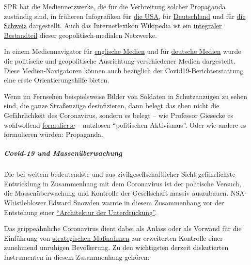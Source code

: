 SPR hat die Mediennetzwerke, die für die Verbreitung solcher Propaganda
zuständig sind, in früheren Infografiken für
\href{https://swprs.org/das-american-empire-und-seine-medien/}{die USA},
für \href{https://swprs.org/netzwerk-medien-deutschland/}{Deutschland}
und für \href{https://swprs.org/netzwerk-medien-schweiz/}{die Schweiz}
dargestellt. Auch das Internetlexikon Wikipedia ist ein
\href{https://swprs.org/wikipedia-disinformation-operation/}{integraler
Bestandteil} dieser geopolitisch-medialen Netzwerke.

In einem Mediennavigator für
\href{https://swprs.org/media-navigator/}{englische Medien} und für
\href{https://swprs.org/medien-navigator/}{deutsche Medien} wurde die
politische und geopolitische Ausrichtung verschiedener Medien
dargestellt. Diese Medien-Navigatoren können auch bezüglich der
Covid19-Bericht­erstattung eine erste Orientierungshilfe bieten.

Wenn im Fernsehen beispielsweise Bilder von Soldaten in Schutzanzügen zu
sehen sind, die ganze Straßenzüge desinfizieren, dann belegt das eben
nicht die Gefährlichkeit des Coronavirus, sondern es belegt -- wie
Professor Giesecke es wohlwollend
\href{https://www.addendum.org/coronavirus/interview-johan-giesecke/}{formulierte}
-- nutzlosen ``politischen Aktivismus''. Oder wie andere es formulieren
würden: Propaganda.

\hypertarget{covid-19-und-massenuxfcberwachung}{%
\subparagraph{\texorpdfstring{\textbf{Covid-19 und
Massenüberwachung}}{Covid-19 und Massenüberwachung}}\label{covid-19-und-massenuxfcberwachung}}

Die bei weitem bedeutendste und aus zivilgesellschaftlicher Sicht
gefährlichste Entwicklung in Zusammenhang mit dem Coronavirus ist der
politische Versuch, die Massenüberwachung und Kontrolle der Gesellschaft
massiv auszubauen. NSA-Whistleblower Edward Snowden warnte in diesem
Zusammenhang vor der Entstehung einer
\href{https://www.vice.com/en_us/article/bvge5q/snowden-warns-governments-are-using-coronavirus-to-build-the-architecture-of-oppression}{``Architektur
der Unterdrückung''}.

Das grippeähnliche Coronavirus dient dabei als Anlass oder als Vorwand
für die Einführung von
\href{https://norberthaering.de/die-regenten-der-welt/id2020-ktdi-apple-google/}{strategischen
Maßnahmen} zur erweiterten Kontrolle einer zunehmend unruhigen
Bevölkerung. Zu den wichtigsten derzeit diskutierten Instrumenten in
diesem Zusammenhang gehören:

